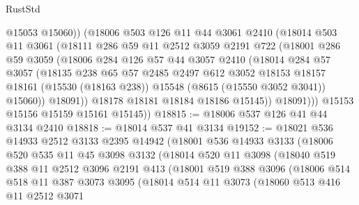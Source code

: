 \begin{lexlean}{RustStd}
\begin{coremodule}
                @15053
                @15060))
            (@18006
              @503
              @126
              @11
              @44
              @3061
              @2410
              (@18014
                @503
                @11
                @3061
                (@18111
                  @286
                  @59
                  @11
                  @2512
                  @3059
                  @2191
                  @722
                  (@18001
                    @286
                    @59
                    @3059
                    (@18006
                      @284
                      @126
                      @57
                      @44
                      @3057
                      @2410
                      (@18014
                        @284
                        @57
                        @3057
                        (@18135
                          @238
                          @65
                          @57
                          @2485
                          @2497
                          @612
                          @3052
                          @18153
                          @18157
                          @18161
                          (@15530 (@18163 @238))
                          @15548
                          (@8615 (@15550 @3052 @3041))
                          @15060))
                      @18091))
                  @18178
                  @18181
                  @18184
                  @18186
                  @15145))
              @18091)))
        @15153
        @15156
        @15159
        @15161
        @15145))
@18815 := @18006 @537 @126 @41 @44 @3134 @2410
@18818 := @18014 @537 @41 @3134
@19152 := @18021
    @536
    @14933
    @2512
    @3133
    @2395
    @14942
    (@18001
      @536
      @14933
      @3133
      (@18006
        @520
        @535
        @11
        @45
        @3098
        @3132
        (@18014
          @520
          @11
          @3098
          (@18040
            @519
            @388
            @11
            @2512
            @3096
            @2191
            @413
            (@18001
              @519
              @388
              @3096
              (@18006
                @514
                @518
                @11
                @387
                @3073
                @3095
                (@18014
                  @514
                  @11
                  @3073
                  (@18060
                    @513
                    @416
                    @11
                    @2512
                    @3071

\end{coremodule}
\end{lexlean}
